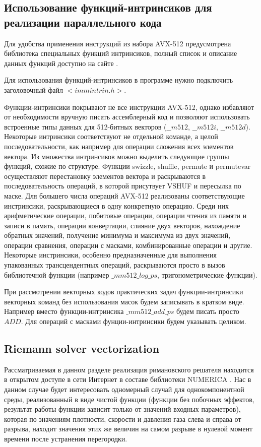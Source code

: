 \documentclass[
11pt,%
tightenlines,%
twoside,%
onecolumn,%
nofloats,%
nobibnotes,%
nofootinbib,%
superscriptaddress,%
noshowpacs,%
centertags]%
{revtex4}
\begin{document}
\subsection{Использование функций-интринсиков для реализации параллельного кода}

Для удобства применения инструкций из набора AVX-512 предусмотрена библиотека специальных функций интринсиков, полный список и описание данных функций доступно на сайте \cite{Intel_Intr}.

Для использования функций-интринсиков в программе нужно подключить заголовочный файл $<immintrin.h>$.

Функции-интринсики покрывают не все инструкции AVX-512, однако избавляют от необходимости вручную писать ассемблерный код и позволяют использовать встроенные типы данных для 512-битных векторов ($\_\_m512$, $\_\_m512i$, $\_\_m512d$).
Некоторые интринсики соответствуют не отдельной команде, а целой последовательности, как например для операции сложения всех элементов вектора.
Из множества интринсиков можно выделить следующие группы функций, схожие по структуре.
Функции swizzle, shuffle, permute и permutevar осуществляют перестановку элементов вектора и раскрываются в последовательность операций, в которой присутвует VSHUF и пересылка по маске.
Для большего числа операций AVX-512 реализованы соответствующие инстринсики, раскрывающиеся в одну конкретную операцию.
Среди них арифметические операции, побитовые операции, операции чтения из памяти и записи в память, операции конвертации, слияние двух векторов, нахождение обратных значений, получение минимума и максимума из двух значений, операции сравнения, операции с масками, комбинированные операции и другие.
Некоторые инстринсики, особенно предназначенные для выполнения упакованных трансцендентных операций, раскрываются просто в вызов библиотечной функции (например $\_mm512\_log\_ps$, тригонометрические функции).

При рассмотрении векторных кодов практических задач функции-интринсики векторных команд без использования масок будем записывать в кратком виде.
Например вместо функции-интринсика $\_mm512\_add\_ps$ будем писать просто $ADD$.
Для операций с масками фунции-интринсики будем указывать целиком.

\subsection{Riemann solver vectorization}

Рассматриваемая в данном разделе реализация римановского решателя находится в открытом доступе в сети Интернет в составе библиотеки NUMERICA \cite{Numerica}.
Нас в данном случае будет интересовать одномерный случай для однокомпонентной среды, реализованный в виде чистой функции (функции без побочных эффектов, результат работы функции зависит только от значений входных параметров), которая по значениям плотности, скорости и давления газа слева и справа от разрыва, находит значения этих же величин на самом разрыве в нулевой момент времени после устранения перегородки.
\end{document}
